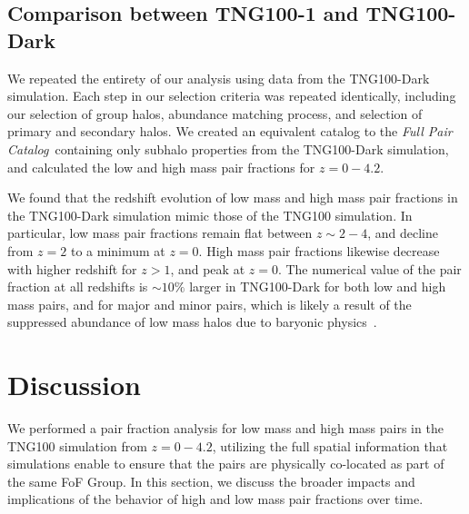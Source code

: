 \documentclass[linenumbers,twocolumn]{aastex631}
\newcommand{\paircat}{\textit{Full Pair Catalog}}
\begin{document}
    \subsection{Comparison between TNG100-1 and TNG100-Dark}\label{sec:disc-dark}
    We repeated the entirety of our analysis using data from the TNG100-Dark simulation.
    Each step in our selection criteria was repeated identically, including our selection of group halos, abundance matching process, and selection of primary and secondary halos.
    We created an equivalent catalog to the \paircat\ containing only subhalo properties from the TNG100-Dark simulation, and calculated the low and high mass pair fractions for $z=0-4.2$. 

    We found that the redshift evolution of low mass and high mass pair fractions in the TNG100-Dark simulation mimic those of the TNG100 simulation. 
    In particular, low mass pair fractions remain flat between $z\sim2-4$, and decline from $z=2$ to a minimum at $z=0$. 
    High mass pair fractions likewise decrease with higher redshift for $z>1$, and peak at $z=0$.
    The numerical value of the pair fraction at all redshifts is $\sim10\%$ larger in TNG100-Dark for both low and high mass pairs, and for major and minor pairs, which is likely a result of the suppressed abundance of low mass halos due to baryonic physics~\citep{chua17}. 


\section{Discussion}\label{sec:discussion}
We performed a pair fraction analysis for low mass and high mass pairs in the TNG100 simulation from $z=0-4.2$, utilizing the full spatial information that simulations enable to ensure that the pairs are physically co-located as part of the same FoF Group. 
In this section, we discuss the broader impacts and implications of the behavior of high and low mass pair fractions over time.
\end{document}
